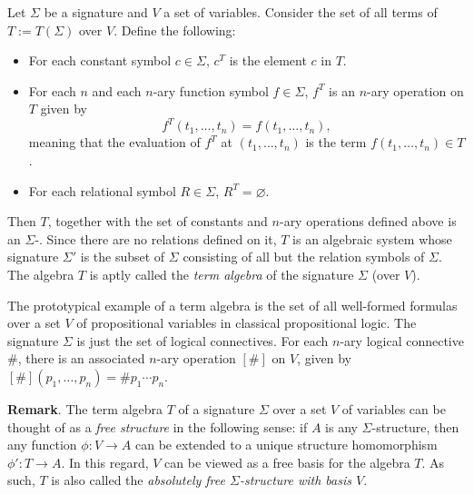 \documentclass[12pt]{article}
\begin{document}

Let $\Sigma$ be a signature and $V$ a set of variables.  Consider the set of all terms of $T:=T(\Sigma)$ over $V$.  Define the following:
\begin{itemize}
\item For each constant symbol $c\in \Sigma$, $c^T$ is the element $c$ in $T$.
\item For each $n$ and each $n$-ary function symbol $f\in \Sigma$, $f^T$ is an $n$-ary operation on $T$ given by $$f^T(t_1,\ldots,t_n)=f(t_1,\ldots,t_n),$$ meaning that the evaluation of $f^T$ at $(t_1,\ldots,t_n)$ is the term $f(t_1,\ldots, t_n)\in T$.
\item For each relational symbol $R\in \Sigma$, $R^T=\varnothing$.
\end{itemize}

Then $T$, together with the set of constants and $n$-ary operations defined above is an $\Sigma$-.  Since there are no relations defined on it, $T$ is an algebraic system whose signature $\Sigma'$ is the subset of $\Sigma$ consisting of all but the relation symbols of $\Sigma$.  The algebra $T$ is aptly called the \emph{term algebra} of the signature $\Sigma$ (over $V$).

The prototypical example of a term algebra is the set of all well-formed formulas over a set $V$ of propositional variables in classical propositional logic.  The signature $\Sigma$ is just the set of logical connectives.  For each $n$-ary logical connective $\#$, there is an associated $n$-ary operation $[\#]$ on $V$, given by $[\#](p_1,\ldots, p_n)=\# p_1 \cdots p_n$.

\textbf{Remark}.  The term algebra $T$ of a signature $\Sigma$ over a set $V$ of variables can be thought of as a \emph{free structure} in the following sense: if $A$ is any $\Sigma$-structure, then any function $\phi:V\to A$ can be extended to a unique structure homomorphism $\phi':T\to A$.  In this regard, $V$ can be viewed as a free basis for the algebra $T$.  As such, $T$ is also called the \emph{absolutely free $\Sigma$-structure with basis $V$}.
\end{document}

